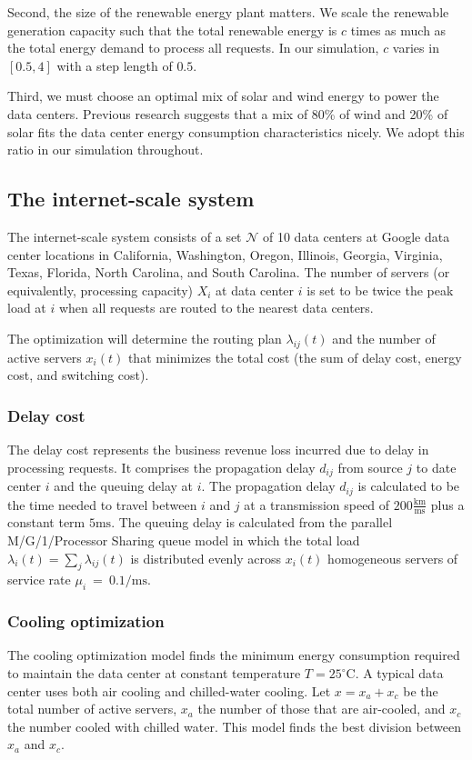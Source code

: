 \documentclass{acm_proc_article-sp}
\begin{document}
Second, the size of the renewable energy plant matters. We scale the renewable generation capacity such that the total renewable energy is $c$ times as much as the total energy demand to process all requests. In our simulation, $c$ varies in $[0.5, 4]$ with a step length of $0.5$.

Third, we must choose an optimal mix of solar and wind energy to power the data centers. Previous research \cite{adam:GLB} suggests that a mix of 80\% of wind and 20\% of solar fits the data center energy consumption characteristics nicely. We adopt this ratio in our simulation throughout.
\subsection{The internet-scale system}
The internet-scale system consists of a set $\mathcal{N}$ of 10 data centers at Google data center locations in California, Washington, Oregon, Illinois, Georgia, Virginia, Texas, Florida, North Carolina, and South Carolina. The number of servers (or equivalently, processing capacity) $X_i$ at data center $i$ is set to be twice the peak load at $i$ when all requests are routed to the nearest data centers.

The optimization will determine the routing plan $\lambda_{ij}(t)$ and the number of active servers $x_i(t)$ that minimizes the total cost (the sum of delay cost, energy cost, and switching cost).

\subsubsection{Delay cost}
The delay cost represents the business revenue loss incurred due to delay in processing requests. It comprises the propagation delay $d_{ij}$ from source $j$ to date center $i$ and the queuing delay at $i$.
The propagation delay $d_{ij}$ is calculated to be the time needed to travel between $i$ and $j$ at a transmission speed of $200 \frac{\mathrm{km}}{\mathrm{ms}}$ plus a constant term $5 \mathrm{ms}$. The queuing delay is calculated from the parallel M/G/1/Processor Sharing queue model in which the total load $\lambda_i(t)=\sum_j \lambda_{ij}(t)$ is distributed evenly across $x_i(t)$ homogeneous servers of service rate \mbox{$\mu_i$ = $0.1 / \mathrm{ms}$}.

\subsubsection{Cooling optimization}
The cooling optimization model finds the minimum energy consumption required to maintain the data center at constant temperature $T = 25^{\circ}\textrm{C}$. A typical data center uses both air cooling and chilled-water cooling. Let $x = x_a + x_c$ be the total number of active servers, $x_a$ the number of those that are air-cooled, and $x_c$ the number cooled with chilled water. This model finds the best division between $x_a$ and $x_c$.
\end{document}
